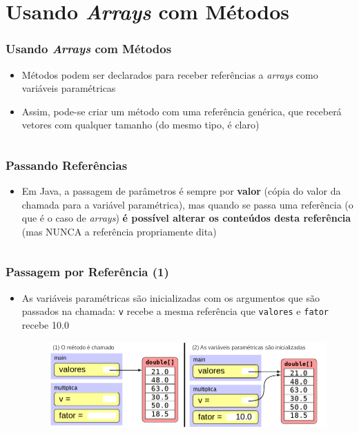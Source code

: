 \documentclass[xcolor={dvipsnames,table},aspectratio=169]{beamer}
\begin{document}
\section{Usando \emph{Arrays} com Métodos}

\begin{frame}[fragile]\frametitle{Usando \emph{Arrays} com Métodos}
\begin{itemize}
	\item Métodos podem ser declarados para receber referências a \emph{arrays} como variáveis paramétricas
	\item Assim, pode-se criar um método com uma referência genérica, que receberá vetores com qualquer tamanho (do mesmo tipo, é claro)
{\tiny\inputminted[bgcolor=cyan!10]{java}{src/Somatorio.java}}
\end{itemize}
\end{frame}

\begin{frame}[fragile]\frametitle{Passando Referências}
\begin{itemize}
	\item Em Java, a passagem de parâmetros é sempre por \textbf{valor} (cópia do valor da chamada para a variável paramétrica), mas quando se passa uma referência (o que é o caso de \emph{arrays}) \textbf{é possível alterar os conteúdos desta referência} (mas NUNCA a referência propriamente dita)
{\tiny\inputminted[bgcolor=cyan!10]{java}{src/Multiplica.java}}
\end{itemize}
\end{frame}

\begin{frame}\frametitle{Passagem por Referência (1)}
\begin{itemize}
	\item As variáveis paramétricas são inicializadas com os argumentos que são passados na chamada: \texttt{v} recebe a mesma referência que \texttt{valores} e \texttt{fator} recebe 10.0
	\begin{figure}[h]
	\includegraphics[height=0.4\paperheight,center]{pucrs-ep-fprog-unidade_06-arrays-laminas-passagem_por_referencia_1.png}
\end{figure}
\end{itemize}
\end{frame}
\end{document}
